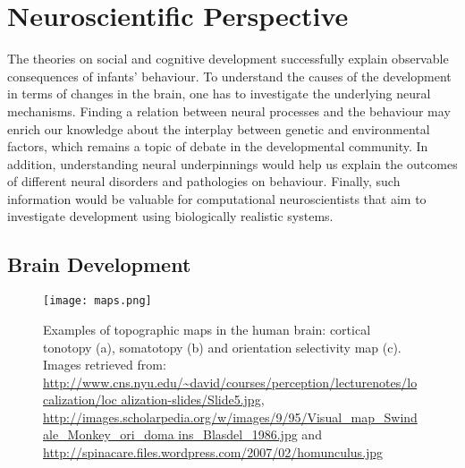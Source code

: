 \section{Neuroscientific Perspective}
\label{sec:neurosci}

The theories on social and cognitive development successfully explain 
observable consequences of infants' behaviour. 
To understand the causes of the development in terms of changes in the brain, 
one has to investigate the underlying neural mechanisms. Finding a relation 
between neural processes and the behaviour may enrich our knowledge about the 
interplay between genetic and environmental factors, which remains a topic of 
debate in the developmental community. In addition, understanding neural 
underpinnings would help us explain the outcomes of different neural disorders 
and pathologies on behaviour. Finally, such information would be valuable for 
computational neuroscientists that aim to investigate development using 
biologically realistic systems.

\subsection{Brain Development}
\label{ssec:braindev}

\begin{figure}[ht]
\centering
\texttt{[image: maps.png]}
\caption[Examples of topographic maps in the human brain]{Examples of
topographic maps in the human brain: cortical tonotopy (a), somatotopy (b) and 
orientation selectivity map (c). Images retrieved from: 
\url{
http://www.cns.nyu.edu/~david/courses/perception/lecturenotes/localization/loc 
alization-slides/Slide5.jpg}, \url{
http://images.scholarpedia.org/w/images/9/95/Visual_map_Swindale_Monkey_ori_doma
ins_Blasdel_1986.jpg}
and \url{http://spinacare.files.wordpress.com/2007/02/homunculus.jpg}}
\label{lab:tonotopy}
\end{figure}

